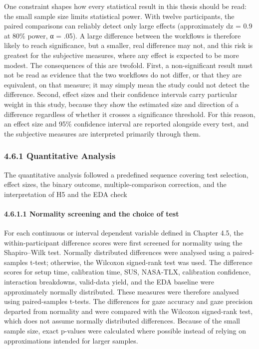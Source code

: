 \documentclass[
]{article}
\begin{document}
One constraint shapes how every statistical result in this thesis should be read: the small sample size limits statistical power. With twelve participants, the paired comparisons can reliably detect only large effects (approximately dz = 0.9 at 80\% power, α = .05). A large difference between the workflows is therefore likely to reach significance, but a smaller, real difference may not, and this risk is greatest for the subjective measures, where any effect is expected to be more modest. The consequences of this are twofold. First, a non-significant result must not be read as evidence that the two workflows do not differ, or that they are equivalent, on that measure; it may simply mean the study could not detect the difference. Second, effect sizes and their confidence intervals carry particular weight in this study, because they show the estimated size and direction of a difference regardless of whether it crosses a significance threshold. For this reason, an effect size and 95\% confidence interval are reported alongside every test, and the subjective measures are interpreted primarily through them.

\hypertarget{quantitative-analysis}{%
\subsubsection{4.6.1 Quantitative Analysis}\label{quantitative-analysis}}

The quantitative analysis followed a predefined sequence covering test selection, effect sizes, the binary outcome, multiple-comparison correction, and the interpretation of H5 and the EDA check

\hypertarget{step-1-normality-screening-and-the-choice-of-test}{%
\paragraph{4.6.1.1 Normality screening and the choice of test}\label{step-1-normality-screening-and-the-choice-of-test}}

For each continuous or interval dependent variable defined in Chapter 4.5, the within-participant difference scores were first screened for normality using the Shapiro--Wilk test. Normally distributed differences were analysed using a paired-samples t-test; otherwise, the Wilcoxon signed-rank test was used. The difference scores for setup time, calibration time, SUS, NASA-TLX, calibration confidence, interaction breakdowns, valid-data yield, and the EDA baseline were approximately normally distributed. These measures were therefore analysed using paired-samples t-tests. The differences for gaze accuracy and gaze precision departed from normality and were compared with the Wilcoxon signed-rank test, which does not assume normally distributed differences. Because of the small sample size, exact p-values were calculated where possible instead of relying on approximations intended for larger samples.
\end{document}

